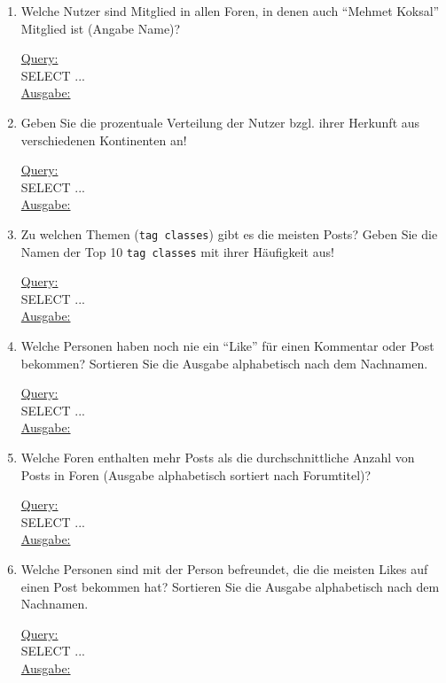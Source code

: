 \begin{enumerate}
    \item Welche Nutzer sind Mitglied in allen Foren, in denen auch \enquote{Mehmet Koksal} Mitglied ist (Angabe Name)?

    \uline{Query:}\\
    SELECT ...\\
    \uline{Ausgabe:}\\

    \item Geben Sie die prozentuale Verteilung der Nutzer bzgl. ihrer Herkunft aus verschiedenen Kontinenten an!

    \uline{Query:}\\
    SELECT ...\\
    \uline{Ausgabe:}\\

    \item Zu welchen Themen (\texttt{tag classes}) gibt es die meisten Posts? Geben Sie die Namen der Top 10 \texttt{tag classes} mit ihrer Häufigkeit aus!

    \uline{Query:}\\
    SELECT ...\\
    \uline{Ausgabe:}\\

    \item Welche Personen haben noch nie ein \enquote{Like} für einen Kommentar oder Post bekommen? Sortieren Sie die Ausgabe alphabetisch nach dem Nachnamen.

    \uline{Query:}\\
    SELECT ...\\
    \uline{Ausgabe:}\\

    \item Welche Foren enthalten mehr Posts als die durchschnittliche Anzahl von Posts in Foren (Ausgabe alphabetisch sortiert nach Forumtitel)?

    \uline{Query:}\\
    SELECT ...\\
    \uline{Ausgabe:}\\

    \item Welche Personen sind mit der Person befreundet, die die meisten Likes auf einen Post bekommen hat? Sortieren Sie die
    Ausgabe alphabetisch nach dem Nachnamen.

    \uline{Query:}\\
    SELECT ...\\
    \uline{Ausgabe:}\\


\end{enumerate}
